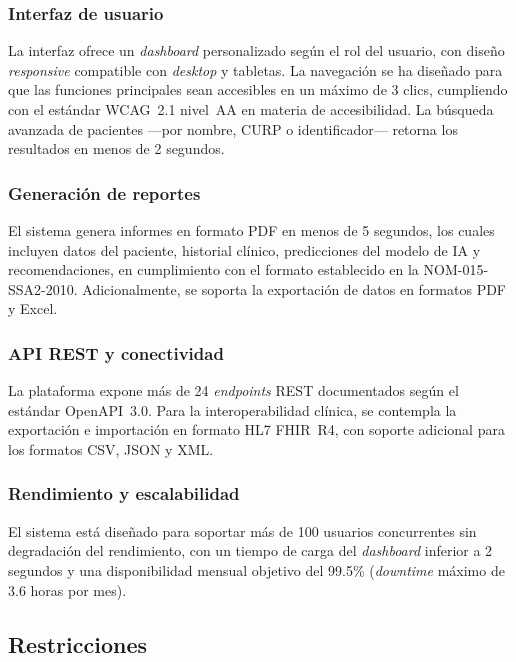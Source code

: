 \documentclass[12pt, letterpaper, twoside]{report}
\begin{document}
\subsubsection{Interfaz de usuario}

La interfaz ofrece un \textit{dashboard} personalizado según el rol del usuario, con diseño \textit{responsive} compatible con \textit{desktop} y tabletas. La navegación se ha diseñado para que las funciones principales sean accesibles en un máximo de 3 clics, cumpliendo con el estándar WCAG~2.1 nivel~AA en materia de accesibilidad. La búsqueda avanzada de pacientes ---por nombre, CURP o identificador--- retorna los resultados en menos de 2 segundos.

\subsubsection{Generación de reportes}

El sistema genera informes en formato PDF en menos de 5 segundos, los cuales incluyen datos del paciente, historial clínico, predicciones del modelo de IA y recomendaciones, en cumplimiento con el formato establecido en la NOM-015-SSA2-2010. Adicionalmente, se soporta la exportación de datos en formatos PDF y Excel.

\subsubsection{API REST y conectividad}

La plataforma expone más de 24 \textit{endpoints} REST documentados según el estándar OpenAPI~3.0. Para la interoperabilidad clínica, se contempla la exportación e importación en formato HL7 FHIR~R4, con soporte adicional para los formatos CSV, JSON y XML.

\subsubsection{Rendimiento y escalabilidad}

El sistema está diseñado para soportar más de 100 usuarios concurrentes sin degradación del rendimiento, con un tiempo de carga del \textit{dashboard} inferior a 2 segundos y una disponibilidad mensual objetivo del 99.5\% (\textit{downtime} máximo de 3.6 horas por mes).

\subsection{Restricciones}
\end{document}

